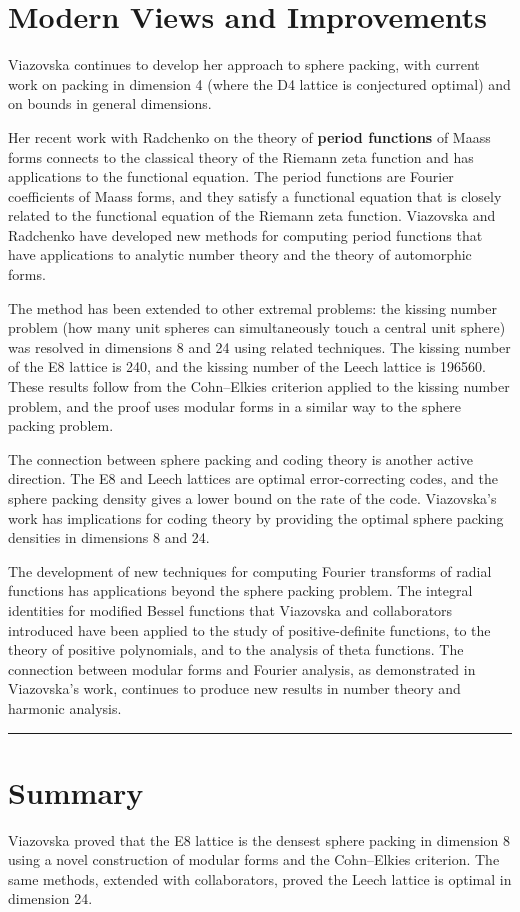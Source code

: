 \section{Modern Views and Improvements}

Viazovska continues to develop her approach to sphere packing, with current work on packing in dimension 4 (where the D4 lattice is conjectured optimal) and on bounds in general dimensions.

Her recent work with Radchenko on the theory of \textbf{period functions} of Maass forms connects to the classical theory of the Riemann zeta function and has applications to the functional equation. The period functions are Fourier coefficients of Maass forms, and they satisfy a functional equation that is closely related to the functional equation of the Riemann zeta function. Viazovska and Radchenko have developed new methods for computing period functions that have applications to analytic number theory and the theory of automorphic forms.

The method has been extended to other extremal problems: the kissing number problem (how many unit spheres can simultaneously touch a central unit sphere) was resolved in dimensions 8 and 24 using related techniques. The kissing number of the E8 lattice is 240, and the kissing number of the Leech lattice is 196560. These results follow from the Cohn--Elkies criterion applied to the kissing number problem, and the proof uses modular forms in a similar way to the sphere packing problem.

The connection between sphere packing and coding theory is another active direction. The E8 and Leech lattices are optimal error-correcting codes, and the sphere packing density gives a lower bound on the rate of the code. Viazovska's work has implications for coding theory by providing the optimal sphere packing densities in dimensions 8 and 24.

The development of new techniques for computing Fourier transforms of radial functions has applications beyond the sphere packing problem. The integral identities for modified Bessel functions that Viazovska and collaborators introduced have been applied to the study of positive-definite functions, to the theory of positive polynomials, and to the analysis of theta functions. The connection between modular forms and Fourier analysis, as demonstrated in Viazovska's work, continues to produce new results in number theory and harmonic analysis.

\begin{center}\rule{0.5\linewidth}{0.5pt}\end{center}

\section*{Summary}

Viazovska proved that the E8 lattice is the densest sphere packing in dimension 8 using a novel construction of modular forms and the Cohn--Elkies criterion. The same methods, extended with collaborators, proved the Leech lattice is optimal in dimension 24.
